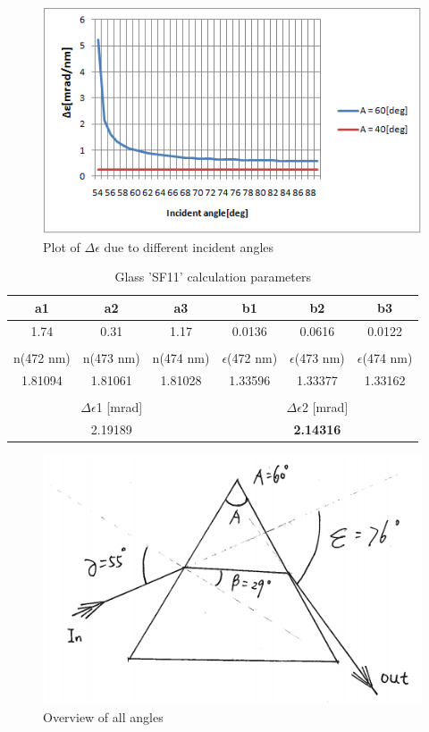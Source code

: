 \begin{figure}[ht!]
\centering
\includegraphics[scale = 1.2]{chapters/img/prism_alpha.png}
\caption{Plot of $\Delta\epsilon$ due to different incident angles}
\label{fig:prism_alpha}
\end{figure}

\begin{table}[ht!]
\centering
\begin{tabular}{ccc|ccc}
  a1 & a2 & a3 & b1 & b2 & b3 \\\hline
  1.74 & 0.31 & 1.17 & 0.0136 & 0.0616 & 0.0122 \\\\
  n(472 nm) & n(473 nm) & n(474 nm) & $\epsilon$(472 nm) & $\epsilon$(473 nm) & $\epsilon$(474 nm) \\\hline 
  1.81094 & 1.81061 & 1.81028 & 1.33596 & 1.33377 & 1.33162 \\\\
   \multicolumn{3}{c|}{$\Delta\epsilon$1 [mrad]} & \multicolumn{3}{c}{$\Delta\epsilon$2 [mrad]}\\\hline
  \multicolumn{3}{c|}{2.19189} & \multicolumn{3}{c}{\textbf{2.14316}} 
 \end{tabular}
\caption{Glass 'SF11' calculation parameters}
\label{tab:SF11}
\end{table}

\begin{figure}[ht!]
\centering
\includegraphics[scale = 0.8]{chapters/img/prism_final.png}
\caption{Overview of all angles}
\label{fig:prism_final}
\end{figure}

